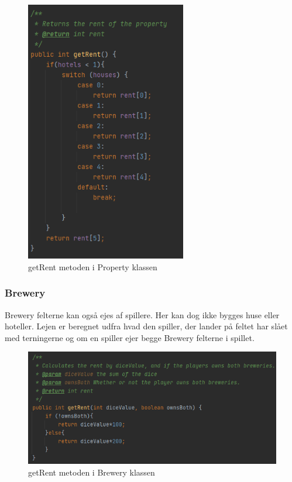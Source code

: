 \begin{figure}[H]
    \centering
    \includegraphics[width=7cm]{sources/7_implementering/propRent.PNG}
    \caption{getRent metoden i Property klassen}
    \label{fig:getRentPR}
\end{figure}

\newpage
\subsubsection{Brewery}
Brewery felterne kan også ejes af spillere. Her kan dog ikke bygges huse eller hoteller. Lejen er beregnet udfra hvad den spiller, der lander på feltet har slået med terningerne og om en spiller ejer begge Brewery felterne i spillet. 

\begin{figure}[H]
    \centering
    \includegraphics[width=\textwidth]{sources/7_implementering/breweryrent.PNG}
    \caption{getRent metoden i Brewery klassen}
    \label{fig:getRentBR}
\end{figure}

